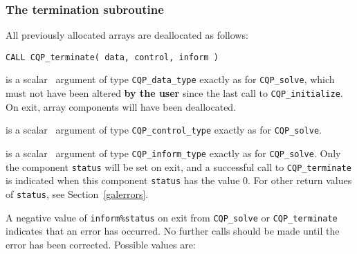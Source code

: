 \documentclass{galahad}
\newcommand{\packagename}{CQP}
\begin{document}

\subsubsection{The  termination subroutine}
All previously allocated arrays are deallocated as follows:
\vspace*{1mm}

\hspace{8mm}
{\tt CALL \packagename\_terminate( data, control, inform )}

\vspace*{-3mm}
\begin{description}

 is a scalar \intentinout\ argument of type
{\tt \packagename\_data\_type}
exactly as for
{\tt \packagename\_solve},
which must not have been altered {\bf by the user} since the last call to
{\tt \packagename\_initialize}.
On exit, array components will have been deallocated.

 is a scalar \intentin\ argument of type
{\tt \packagename\_control\_type}
exactly as for
{\tt \packagename\_solve}.

 is a scalar \intentout\ argument of type
{\tt \packagename\_inform\_type}
exactly as for
{\tt \packagename\_solve}.
Only the component {\tt status} will be set on exit, and a
successful call to
{\tt \packagename\_terminate}
is indicated when this  component {\tt status} has the value 0.
For other return values of {\tt status}, see Section~\ref{galerrors}.

\end{description}



\galerrors
A negative value of {\tt inform\%status} on exit from
{\tt \packagename\_solve}
or
{\tt \packagename\_terminate}
indicates that an error has occurred. No further calls should be made
until the error has been corrected. Possible values are:
\end{document}
